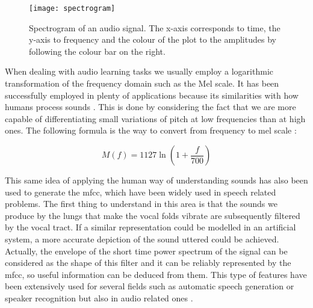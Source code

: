 	\begin{figure}[H]
		\centering
		\captionsetup{justification=centering}
		\texttt{[image: spectrogram]}
		\caption{Spectrogram of an audio signal. The x-axis corresponds to time, the y-axis to frequency and the colour of the plot to the amplitudes by following the colour bar on the right.}
		\label{fig:mesh51}
	\end{figure}

	When dealing with audio learning tasks we usually employ a logarithmic transformation of the frequency domain such as the Mel scale. %
	It has been successfully employed in plenty of applications because its similarities with how humans process sounds \cite{Gartzman2019}. This is done by considering the fact that we are more capable of differentiating small variations of pitch at low frequencies than at high ones. The following formula is the way to convert from frequency to mel scale \cite{Beranek1950}:
	
	\[M(f) = 1127 \ln{(1 + \frac{f}{700})}\]
	
	This same idea of applying the human way of understanding sounds has also been used to generate the \acrfull{mfcc}, which have been widely used in speech related problems. The first thing to understand in this area is that the sounds we produce by the lungs that make the vocal folds vibrate are subsequently filtered by the vocal tract. If a similar representation could be modelled in an artificial system, a more accurate depiction of the sound uttered could be achieved. Actually, the envelope of the short time power spectrum of the signal can be considered as the shape of this filter and it can be reliably represented by the \acrshort{mfcc}, so useful information can be deduced from them. This type of features have been extensively used for several fields such as automatic speech generation or speaker recognition but also in audio related ones \cite{Giannakopoulos2014}. 
	
	
	
	
	